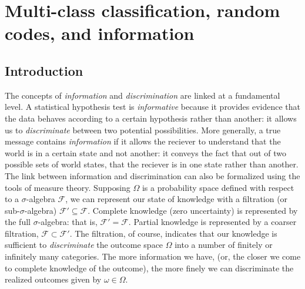 
\chapter{Multi-class classification, random codes, and information} %

\label{Chapter1} %


\newcommand{\keyword}[1]{\textbf{#1}}
\newcommand{\tabhead}[1]{\textbf{#1}}
\newcommand{\code}[1]{\texttt{#1}}
\newcommand{\file}[1]{\texttt{\bfseries#1}}
\newcommand{\option}[1]{\texttt{\itshape#1}}



\section{Introduction}

The concepts of \emph{information} and \emph{discrimination} are
linked at a fundamental level.  A statistical hypothesis test is
\emph{informative} because it provides evidence that the data behaves
according to a certain hypothesis rather than another: it allows us to
\emph{discriminate} between two potential possibilities.  More
generally, a true message contains \emph{information} if it allows the
reciever to understand that the world is in a certain state and not
another: it conveys the fact that out of two possible sets of world
states, that the reciever is in one state rather than another.  The
link between information and discrimination can also be formalized
using the tools of measure theory.  Supposing $\Omega$ is a
probability space defined with respect to a $\sigma$-algebra
$\mathcal{F}$, we can represent our state of knowledge with a
filtration (or sub-$\sigma$-algebra) $\mathcal{F}' \subseteq
\mathcal{F}$.  Complete knowledge (zero uncertainty) is represented by
the full $\sigma$-algebra: that is, $\mathcal{F}' = \mathcal{F}$.
Partial knowledge is represented by a coarser filtration, $\mathcal{F}
\subset \mathcal{F}'$.  The filtration, of course, indicates that our
knowledge is sufficient to \emph{discriminate} the outcome space
$\Omega$ into a number of finitely or infinitely many categories.  The
more information we have, (or, the closer we come to complete
knowledge of the outcome), the more finely we can discriminate the
realized outcomes given by $\omega \in \Omega$.

